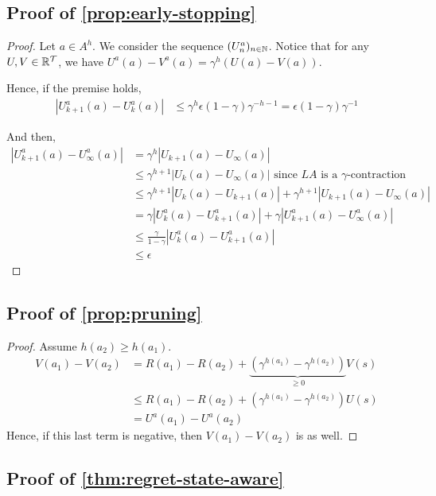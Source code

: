 \documentclass{article}
\begin{document}
\subsection{Proof of \autoref{prop:early-stopping}}

\begin{proof}
Let $a\in A^h$. We consider the sequence $(U^a_n)_{n\in\mathbb{N}}$.
Notice that for any $U,V\in\mathbb{R}^{\mathcal{T}}$, we have $U^a(a)-V^a(a)=\gamma^h(U(a)-V(a))$.

Hence, if the premise holds,
\begin{align*}
    |U^a_{k+1}(a) - U^a_{k}(a)| &\leq \gamma^h\epsilon (1-\gamma)\gamma^{-h-1} = \epsilon (1-\gamma)\gamma^{-1}
\end{align*}

And then,
\begin{align*}
|U^a_{k+1}(a) - U^a_\infty(a)| &= \gamma^h |U_{k+1}(a) - U_\infty(a)|\\
&\leq \gamma^{h+1}|U_{k}(a) - U_\infty(a)| \text{ since $LA$ is a $\gamma$-contraction}\\
&\leq \gamma^{h+1}|U_{k}(a) - U_{k+1}(a)| + \gamma^{h+1}|U_{k+1}(a) - U_\infty(a)|\\
&= \gamma|U^a_{k}(a) - U^a_{k+1}(a)| + \gamma |U^a_{k+1}(a) - U^a_\infty(a)|\\
&\leq \frac{\gamma}{1-\gamma} |U^a_{k}(a) - U^a_{k+1}(a)|\\
&\leq\epsilon
\end{align*}
\end{proof}

\subsection{Proof of \autoref{prop:pruning}}

\begin{proof}
Assume $h(a_2) \geq h(a_1)$.
\begin{align*}
    V(a_1) - V(a_2) &= R(a_1)- R(a_2) + \underbrace{\left(\gamma^{h(a_1)} - \gamma^{h(a_2)}\right)}_{\geq 0}V(s) \\
    &\leq R(a_1)- R(a_2) + \left(\gamma^{h(a_1)} - \gamma^{h(a_2)}\right)U(s)\\
    &= U^a(a_1) - U^a(a_2)
\end{align*}
Hence, if this last term is negative, then $V(a_1) - V(a_2)$ is as well.
\end{proof}

\subsection{Proof of \autoref{thm:regret-state-aware}}
\end{document}
